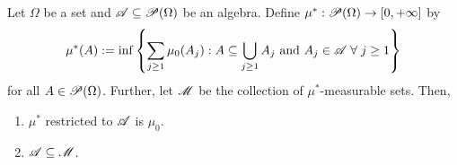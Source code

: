 \begin{proposition}
    Let $\Omega$ be a set and $\mathscr{A} \subseteq \mathscr{P}(\Omega)$ be an algebra. Define $\mu^*: \mathscr{P}(\Omega) \to [0, +\infty]$ by
    \begin{equation*}
        \mu^*(A) := \inf\left\{ \sum_{j\geq 1} \mu_0(A_j) : A \subseteq \bigcup_{j \geq 1} A_j \text{ and } A_j \in \mathscr{A} \; \forall \; j \geq 1 \right\}
    \end{equation*}
    for all $A \in \mathscr{P}(\Omega)$. Further, let $\mathscr{M}$ be the collection of $\mu^*$-measurable sets. Then, 
    \begin{enumerate}
        \item $\mu^*$ restricted to $\mathscr{A}$ is $\mu_0$.
        \item $\mathscr{A} \subseteq \mathscr{M}$.
    \end{enumerate}
\end{proposition}

